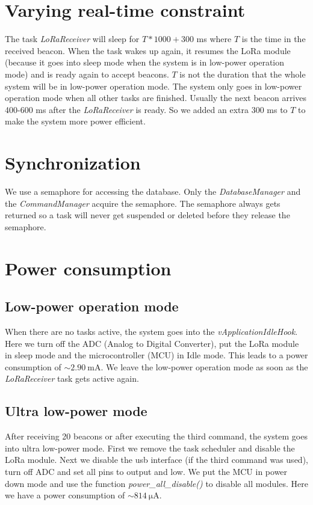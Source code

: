 \documentclass{scrartcl}
\begin{document}
\section{Varying real-time constraint}
The task \textit{LoRaReceiver} will sleep for $T*1000 + 300$ \si{\milli\second} where $T$ is the time in the received beacon.
When the task wakes up again, it resumes the LoRa module (because it goes into sleep mode when the system is in low-power operation mode)
and is ready again to accept beacons. $T$ is not the duration that the whole system will be in low-power operation mode.
The system only goes in low-power operation mode when all other tasks are finished.
Usually the next beacon arrives 400-600 \si{\milli\second} after the \textit{LoRaReceiver} is ready.
So we added an extra 300 \si{\milli\second} to $T$ to make the system more power efficient.

\section{Synchronization}
We use a semaphore for accessing the database. Only the \textit{DatabaseManager} and the \textit{CommandManager} acquire the semaphore.
The semaphore always gets returned so a task will never get suspended or deleted before they release the semaphore.

\newpage

\section{Power consumption}
\subsection{Low-power operation mode}
When there are no tasks active, the system goes into the \textit{vApplicationIdleHook}.
Here we turn off the ADC (Analog to Digital Converter),
put the LoRa module in sleep mode and the microcontroller (MCU) in Idle mode.
This leads to a power consumption of $\sim \SI{2.90}{\milli\ampere}$.
We leave the low-power operation mode as soon as the \textit{LoRaReceiver} task gets active again.

\subsection{Ultra low-power mode}
After receiving 20 beacons or after executing the third command, the system goes into ultra low-power mode.
First we remove the task scheduler and disable the LoRa module.
Next we disable the usb interface (if the third command was used), turn off ADC and set all pins to output and low.
We put the MCU in power down mode and use the function \textit{power\_all\_disable()} to disable all modules.
Here we have a power consumption of $\sim \SI{814}{\micro\ampere}$.
\end{document}
